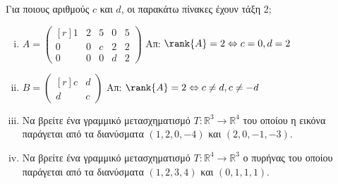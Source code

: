 
	\item Για ποιους αριθμούς $c$ και $d$, οι παρακάτω πίνακες έχουν τάξη 2; 
		\begin{enumerate}[(i)]
			\item $ A = 
				\begin{pmatrix*}[r]
					1 & 2 & 5 & 0 & 5 \\
					0 & 0 & c & 2 & 2 \\
					0 & 0 & 0 & d & 2
				\end{pmatrix*} $ \hfill Απ: $ \rank{A} = 2 \Leftrightarrow c=0, d=2 $ 
			\item $ B = 
				\begin{pmatrix*}[r]
					c & d \\
					d & c
				\end{pmatrix*} $ \hfill Απ: $ \rank{A} = 2 \Leftrightarrow c \neq d, c \neq -d $ 

    \item Να βρείτε ένα γραμμικό μετασχηματισμό $ T: \mathbb{R}^{3}\to \mathbb{R}^{4} $ του οποίου η
        εικόνα παράγεται από τα διανύσματα $ (1,2,0,-4) $ και $ (2,0,-1,-3) $.

    \item Να βρείτε ένα γραμμικό μετασχηματισμό $ T: \mathbb{R}^{4}\to \mathbb{R}^{3} $ ο πυρήνας
        του οποίου παράγεται από τα διανύσματα $ (1,2,3,4) $ και $ (0,1,1,1) $.
		\end{enumerate}
